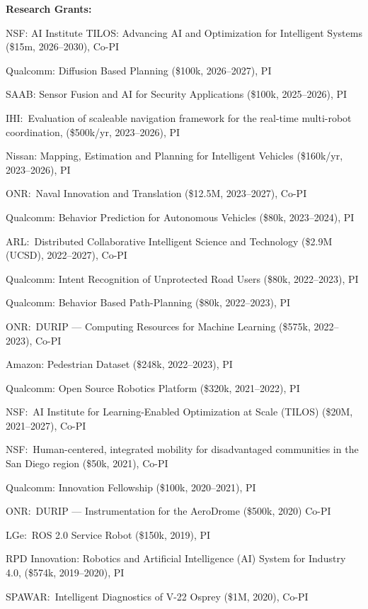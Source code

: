 \documentclass{article}
\begin{document}
\begin{cv}
	\begin{cvlist}{\bf Research Grants:}
		\item NSF: AI Institute TILOS: Advancing AI and Optimization for
		Intelligent Systems (\$15m, 2026--2030), Co-PI
		\item Qualcomm: Diffusion Based Planning (\$100k, 2026--2027), PI
		\item SAAB: Sensor Fusion and AI for Security Applications (\$100k, 2025--2026), PI
		\item IHI:\ Evaluation of scaleable navigation framework for the real-time
		multi-robot coordination, (\$500k/yr, 2023--2026), PI
		\item Nissan: Mapping, Estimation and Planning for Intelligent Vehicles
		(\$160k/yr, 2023--2026), PI
		\item ONR:\ Naval Innovation and Translation (\$12.5M, 2023--2027), Co-PI
		\item Qualcomm: Behavior Prediction for Autonomous Vehicles (\$80k, 2023--2024), PI
		\item ARL:\ Distributed Collaborative Intelligent Science and Technology (\$2.9M
		(UCSD), 2022--2027), Co-PI
		\item Qualcomm: Intent Recognition of Unprotected Road Users (\$80k, 2022--2023),
		PI
		\item Qualcomm: Behavior Based Path-Planning (\$80k, 2022--2023), PI
		\item ONR:\ DURIP --- Computing Resources for Machine Learning (\$575k, 2022--2023),
		Co-PI
		\item Amazon: Pedestrian Dataset (\$248k, 2022--2023), PI
		\item Qualcomm: Open Source Robotics Platform (\$320k, 2021--2022), PI
		\item NSF:\ AI Institute for Learning-Enabled Optimization at Scale
		(TILOS) (\$20M, 2021--2027), Co-PI
		\item NSF:\ Human-centered, integrated mobility for disadvantaged
		communities in the San Diego region (\$50k, 2021), Co-PI
		\item Qualcomm: Innovation Fellowship (\$100k, 2020--2021), PI
		\item ONR:\ DURIP --- Instrumentation for the AeroDrome (\$500k, 2020) Co-PI
		\item LGe:\ ROS 2.0 Service Robot (\$150k, 2019), PI
		\item RPD Innovation: Robotics and Artificial Intelligence (AI) System for
		Industry 4.0, (\$574k, 2019--2020), PI
		\item SPAWAR:\ Intelligent Diagnostics of V-22 Osprey (\$1M, 2020), Co-PI

\end{cvlist}
\end{cv}
\end{document}
